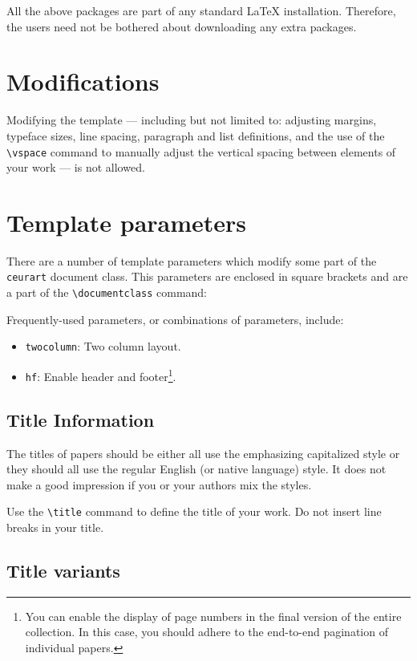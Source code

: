 \documentclass[
]{ceurart}
\begin{document}
All the above packages are part of any
standard \LaTeX{} installation.
Therefore, the users need not be
bothered about downloading any extra packages.

\section{Modifications}

Modifying the template --- including but not limited to: adjusting
margins, typeface sizes, line spacing, paragraph and list definitions,
and the use of the \verb|\vspace| command to manually adjust the
vertical spacing between elements of your work --- is not allowed.

\section{Template parameters}

There are a number of template
parameters which modify some part of the \verb|ceurart| document class.
This parameters are enclosed in square
brackets and are a part of the \verb|\documentclass| command:

Frequently-used parameters, or combinations of parameters, include:
\begin{itemize}
\item {\verb|twocolumn|}: Two column layout.
\item {\verb|hf|}: Enable header and footer\footnote{You can enable
    the display of page numbers in the final version of the entire
    collection. In this case, you should adhere to the end-to-end
    pagination of individual papers.}.
\end{itemize}


\subsection{Title Information}

The titles of papers should be either all use the emphasizing
capitalized style or they should all use the regular English (or
native language) style. It does not make a good impression if you or
your authors mix the styles.

Use the \verb|\title| command to define the title of your work. Do not
insert line breaks in your title.

\subsection{Title variants}
\end{document}

